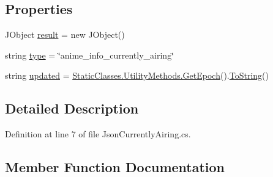 \subsection*{Properties}
\begin{DoxyCompactItemize}
\item 
J\+Object \mbox{\hyperlink{class_little_weeb_library_1_1_models_1_1_json_currently_airing_ae1ec08105360df0bacaf657a57a6d0d8}{result}} = new J\+Object()
\item 
string \mbox{\hyperlink{class_little_weeb_library_1_1_models_1_1_json_currently_airing_a0a27db3207e9fb88e8258c86481d5d0a}{type}} = \char`\"{}anime\+\_\+info\+\_\+currently\+\_\+airing\char`\"{}
\item 
string \mbox{\hyperlink{class_little_weeb_library_1_1_models_1_1_json_currently_airing_aede3bf8f88b0414bc723f79fd62cd0af}{updated}} = \mbox{\hyperlink{class_little_weeb_library_1_1_static_classes_1_1_utility_methods_a12336d9e64983ddabaad8950486fafb2}{Static\+Classes.\+Utility\+Methods.\+Get\+Epoch}}().\mbox{\hyperlink{class_little_weeb_library_1_1_models_1_1_json_currently_airing_a330c337c9e0ddf2866a9a102ae0e9880}{To\+String}}()
\end{DoxyCompactItemize}


\subsection{Detailed Description}


Definition at line 7 of file Json\+Currently\+Airing.\+cs.



\subsection{Member Function Documentation}
\mbox{\label{class_little_weeb_library_1_1_models_1_1_json_currently_airing_a5e56160f130c25bd439904d14b5bdbc4}} 
